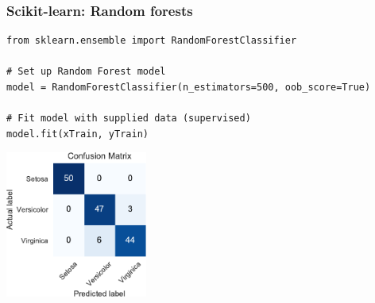 \documentclass[pdf]{beamer}
\begin{document}
\begin{frame}[fragile]
\frametitle{Scikit-learn: Random forests}

\begin{lstlisting}[style=python]
from sklearn.ensemble import RandomForestClassifier

# Set up Random Forest model
model = RandomForestClassifier(n_estimators=500, oob_score=True)

# Fit model with supplied data (supervised)
model.fit(xTrain, yTrain)
\end{lstlisting}



\centering
\includegraphics[width=0.35\textwidth]{confusion_matrix.pdf}

\end{frame}
\end{document}
